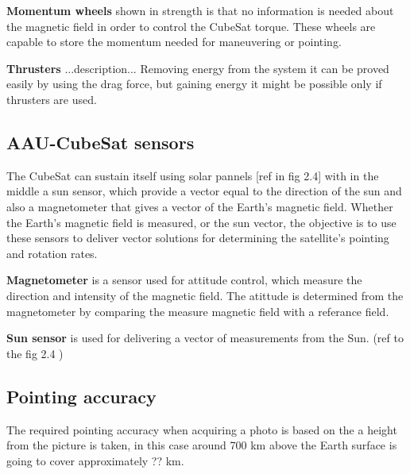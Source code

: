 %
\textbf{Momentum wheels} shown in  strength is that no information is needed about the magnetic field in order to control the CubeSat torque. These wheels are capable to store the momentum needed for maneuvering or pointing.

\textbf{Thrusters} ...description... Removing energy from the system it can be proved easily by using the drag force, but gaining energy it might be possible only if thrusters are used.
%
\subsection{AAU-CubeSat sensors}
The CubeSat can sustain itself using solar pannels [ref in fig 2.4] with in the middle a sun sensor, which provide a vector equal to the direction of the sun and also a magnetometer that gives a vector of the Earth's magnetic field. Whether the Earth’s magnetic field is measured, or the sun vector, the objective is to use these sensors to deliver vector solutions for determining the satellite’s pointing and rotation rates.

\textbf{Magnetometer} is a sensor used for attitude control, which measure the direction and intensity of the magnetic field. The atittude is determined from the magnetometer by comparing the measure magnetic field with a referance field.

\textbf{Sun sensor} is used for delivering a vector of measurements from the Sun. (ref to the fig 2.4 )
%
\subsection{Pointing accuracy}
The required pointing accuracy when acquiring a photo is based on the a height from the picture is taken, in this case around 700 km above the Earth surface is going to cover approximately ?? km. 



